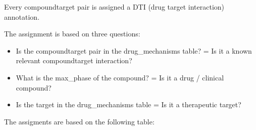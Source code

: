 \documentclass[letterpaper,10pt,english]{sphinxmanual}
\begin{document}
\begin{fulllineitems}
\label{\detokenize{add_dti_annotations:add_dti_annotations.add_dti_annotations}}
\pysigstartsignatures
{}
\pysigstopsignatures
\sphinxAtStartPar
Every compound\sphinxhyphen{}target pair is assigned a DTI (drug target interaction) annotation.

\sphinxAtStartPar
The assignment is based on three questions:
\begin{itemize}
\item {} 
\sphinxAtStartPar
Is the compound\sphinxhyphen{}target pair in the drug\_mechanisms table? = Is it a known relevant compound\sphinxhyphen{}target interaction?

\item {} 
\sphinxAtStartPar
What is the max\_phase of the compound? = Is it a drug / clinical compound?

\item {} 
\sphinxAtStartPar
Is the target in the drug\_mechanisms table = Is it a therapeutic target?

\end{itemize}

\sphinxAtStartPar
The assigments are based on the following table:



\end{fulllineitems}
\end{document}
